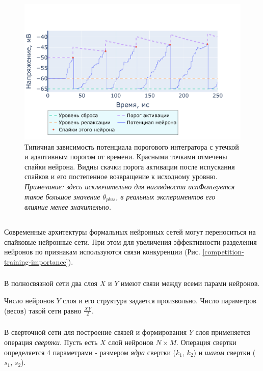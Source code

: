 \documentclass[a4paper]{article}
\begin{document}
\begin{center}
\begin{figure}[H]
 \includegraphics[width=\textwidth,keepaspectratio=true]{model_alif_ru.pdf}
 \caption{Типичная зависимость потенциала порогового интегратора с утечкой и адаптивным порогом от времени. Красными точками отмечены спайки нейрона. Видны скачки порога активации после испускания спайков и его постепенное возвращение к исходному уровню.\\
 \textit{Примечание: здесь исключительно для наглядности испФользуется такое большое значение $\theta_{plus}$, в реальных экспериментов его влияние менее значительно.}}
\end{figure} 
\end{center}

\subsection{}
Современные архитектуры формальных нейронных сетей могут переноситься на спайковые нейронные сети. При этом для увеличения эффективности разделения нейронов по признакам используются связи конкуренции (Рис. \ref{competition-training-importance}). 

\subsubsection{}
В полносвязной сети два слоя $X$ и $Y$ имеют связи между всеми парами нейронов.

Число нейронов $Y$ слоя и его структура задается произвольно. Число параметров (весов) такой сети равно $\frac{XY}{2}$.

\subsubsection{}
В сверточной сети для построение связей и формирования $Y$ слоя применяется операция \textit{свертки}. Пусть есть $X$ слой нейронов $N \times M$. Операция свертки определяется 4 параметрами - размером \textit{ядра} свертки ($k_1$, $k_2$) и \textit{шагом} свертки ($s_1$, $s_2$).
\end{document}
